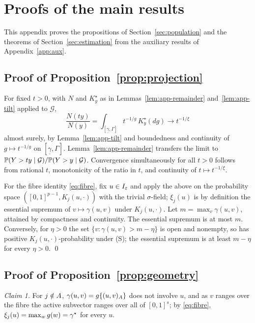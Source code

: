 \section{Proofs of the main results}
\label{app:proofs}
\renewcommand{\theequation}{B.\arabic{equation}}
\setcounter{equation}{0}

This appendix proves the propositions of Section~\ref{sec:population}
and the theorems of Section~\ref{sec:estimation} from the auxiliary
results of Appendix~\ref{app:aux}.

\subsection{Proof of Proposition~\ref{prop:projection}}

For fixed $t>0$, with $N$ and $K_y^\star$ as in
Lemmas~\ref{lem:app-remainder} and~\ref{lem:app-tilt} applied to
$\mathcal G$,
\[
 \frac{N(ty)}{N(y)}
 =\int_{[\underline\gamma,\Gamma]}t^{-1/g}\,K_y^\star(dg)
 \longrightarrow t^{-1/\xi}
\]
almost surely, by Lemma~\ref{lem:app-tilt} and boundedness and
continuity of $g\mapsto t^{-1/g}$ on $[\underline\gamma,\Gamma]$.
Lemma~\ref{lem:app-remainder} transfers the limit to
$\mathbb P(Y>ty\mid\mathcal G)/\mathbb P(Y>y\mid\mathcal G)$.  Convergence
simultaneously for all $t>0$ follows from rational $t$, monotonicity of
the ratio in $t$, and continuity of $t\mapsto t^{-1/\xi}$.

For the fibre identity \eqref{eq:fibre}, fix $u\in I_\varepsilon$ and apply the above
on the probability space $([0,1]^{p-1},K_j(u,\cdot))$ with the trivial
$\sigma$-field; $\xi_j(u)$ is by definition the essential supremum of
$v\mapsto\gamma(u,v)$ under $K_j(u,\cdot)$.  Let
$m=\max_v\gamma(u,v)$, attained by compactness and continuity.  The
essential supremum is at most $m$.  Conversely, for $\eta>0$ the set
$\{v:\gamma(u,v)>m-\eta\}$ is open and nonempty, so has positive
$K_j(u,\cdot)$-probability under (S); the essential supremum is at least
$m-\eta$ for every $\eta>0$.  \qed

\subsection{Proof of Proposition~\ref{prop:geometry}}

\emph{Claim 1.}  For $j\notin A$, $\gamma(u,v)=g\{(u,v)_{A}\}$ does not
involve $u$, and as $v$ ranges over the fibre the active subvector ranges
over all of $[0,1]^{s}$; by \eqref{eq:fibre},
$\xi_j(u)=\max_{w}g(w)=\gamma^\star$ for every $u$.

